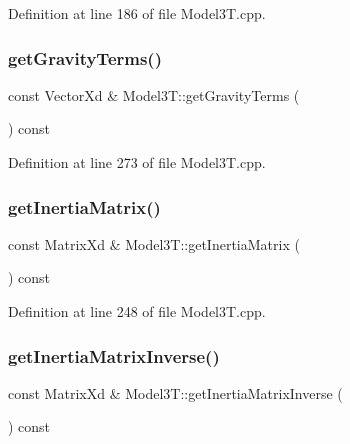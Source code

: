 Definition at line 186 of file Model3\+T.\+cpp.

\hypertarget{classModel3T_a593775a88272c140518b679ad910a89c}{}\label{classModel3T_a593775a88272c140518b679ad910a89c} 
\subsubsection{\texorpdfstring{get\+Gravity\+Terms()}{getGravityTerms()}}
{\footnotesize\ttfamily const Vector\+Xd \& Model3\+T\+::get\+Gravity\+Terms (\begin{DoxyParamCaption}{ }\end{DoxyParamCaption}) const\hspace{0.3cm}{\ttfamily [virtual]}}



Definition at line 273 of file Model3\+T.\+cpp.

\hypertarget{classModel3T_a0ba3b76d91e6121e472ab316e17382e1}{}\label{classModel3T_a0ba3b76d91e6121e472ab316e17382e1} 
\subsubsection{\texorpdfstring{get\+Inertia\+Matrix()}{getInertiaMatrix()}}
{\footnotesize\ttfamily const Matrix\+Xd \& Model3\+T\+::get\+Inertia\+Matrix (\begin{DoxyParamCaption}{ }\end{DoxyParamCaption}) const\hspace{0.3cm}{\ttfamily [virtual]}}



Definition at line 248 of file Model3\+T.\+cpp.

\hypertarget{classModel3T_a25860bdbf24d115cc7dafe75cc7a8197}{}\label{classModel3T_a25860bdbf24d115cc7dafe75cc7a8197} 
\subsubsection{\texorpdfstring{get\+Inertia\+Matrix\+Inverse()}{getInertiaMatrixInverse()}}
{\footnotesize\ttfamily const Matrix\+Xd \& Model3\+T\+::get\+Inertia\+Matrix\+Inverse (\begin{DoxyParamCaption}{ }\end{DoxyParamCaption}) const\hspace{0.3cm}{\ttfamily [virtual]}}



